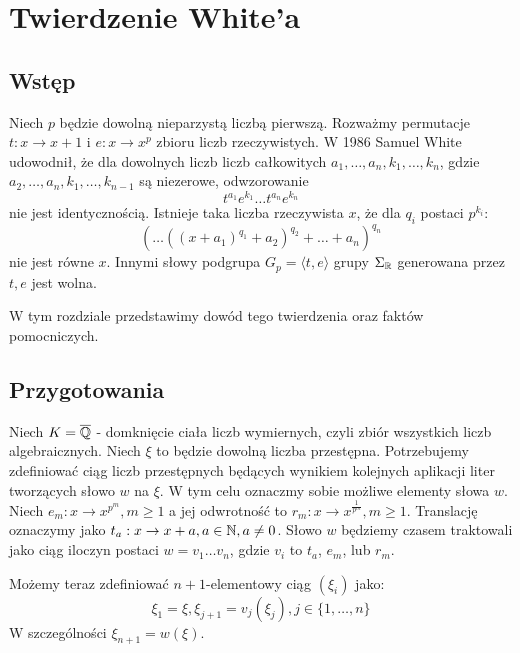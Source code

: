 \chapter{Twierdzenie White'a}
\label{ch:white_theorem}
\section{Wstęp}

Niech $p$ będzie dowolną nieparzystą liczbą pierwszą. Rozważmy permutacje $t :
x \rightarrow  x+1$ i $e: x \rightarrow x^p$ zbioru liczb rzeczywistych. W 1986
Samuel White \cite{whi88} udowodnił, że dla dowolnych liczb liczb całkowitych
$a_1, \ldots, a_n, k_1, \ldots, k_n$, gdzie $a_2, \ldots, a_n, k_1, \ldots,
k_{n-1}$ są niezerowe, odwzorowanie
\begin{equation*}
  t^{a_1}e^{k_1}\ldots t^{a_n}e^{k_n}
\end{equation*}
nie jest identycznością. Istnieje taka liczba rzeczywista $x$, że dla $q_i$
postaci $p^{k_i}$:
\begin{equation}
  \left( \ldots \left(\left(x + a_1\right)^{q_1} + a_2\right)^{q_2} +
    \ldots + a_n\right)^{q_n}
\label{eq:gp_element}
\end{equation}
nie jest równe $x$. Innymi słowy podgrupa $G_p = \langle t, e \rangle$ grupy
$\Sigma_{\mathbb{R}}$ generowana przez $t, e$ jest wolna.

W tym rozdziale przedstawimy dowód tego twierdzenia oraz faktów pomocniczych.

\section{Przygotowania}
\label{sec:preparation}
Niech $K = \overline{\mathbb{Q}}$ - domknięcie ciała liczb wymiernych, czyli zbiór
wszystkich liczb algebraicznych.
Niech $\xi$ to będzie dowolną liczba przestępna.
Potrzebujemy zdefiniować ciąg liczb przestępnych będących wynikiem kolejnych
aplikacji liter tworzących słowo $w$ na $\xi$.
W tym celu oznaczmy sobie możliwe elementy słowa $w$.
Niech $e_m: x \rightarrow x^{p^m}, m \geq 1$ a jej odwrotność to $r_m: x
\rightarrow x^{\frac{1}{p^m}}, m \geq 1$.
Translację oznaczymy jako $t_a: x \rightarrow x + a, a \in \mathbb{N}, a \neq 0$.
Słowo $w$ będziemy czasem traktowali jako ciąg iloczyn postaci $w =
v_1\ldots v_n$, gdzie $v_i$ to $t_a$, $e_m$, lub $r_m$.

Możemy teraz zdefiniować $n+1$-elementowy ciąg $\left(\xi_i\right)$ jako:
\[\xi_1 = \xi, \xi_{j+1} = v_j\left(\xi_j\right), j \in \{1, \ldots, n\}\]
W szczególności $\xi_{n+1} = w(\xi)$.

